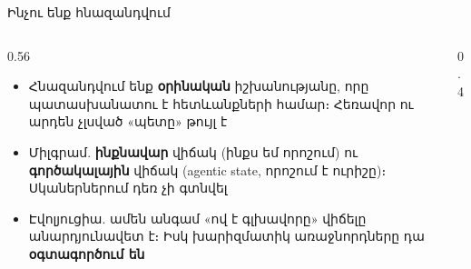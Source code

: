 \begin{frame}{Ինչու ենք հնազանդվում}
  \begin{columns}[T]
    \begin{column}{0.56\textwidth}
      \begin{itemize}
        \item Հնազանդվում ենք \textbf{օրինական} իշխանությանը, որը պատասխանատու է հետևանքների համար։ Հեռավոր ու արդեն չլսված «պետը» թույլ է
        \item<2-> Միլգրամ. \textbf{ինքնավար} վիճակ (ինքս եմ որոշում) ու \textbf{գործակալային} վիճակ (agentic state, որոշում է ուրիշը)։ Սկաներներում դեռ չի գտնվել
        \item<3-> Էվոլյուցիա. ամեն անգամ «ով է գլխավորը» վիճելը անարդյունավետ է։ Իսկ խարիզմատիկ առաջնորդները դա \textbf{օգտագործում են}
      \end{itemize}
    \end{column}
    \begin{column}{0.4\textwidth}
    \end{column}
  \end{columns}
\end{frame}

